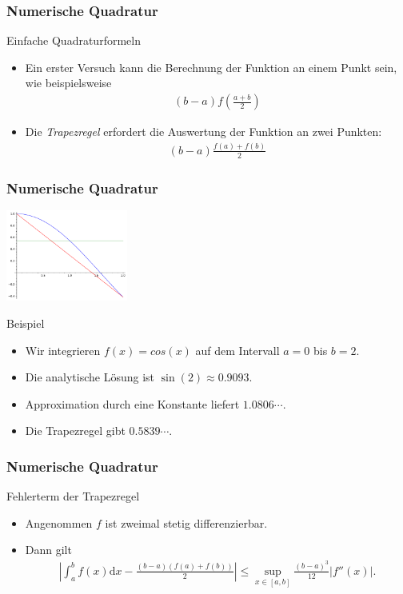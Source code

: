 \documentclass{beamer}
\renewcommand{\emph}[1]{{\textcolor{solarizedRed}{\itshape #1}}}
\newcommand\dd{\mathrm d}
\newcommand{\abs}[1]{\left|#1\right|}
\newcommand\bc[1]{\left({#1}\right)}
\newcommand\bcfr[2]{\bc{\frac{#1}{#2}}}
\renewcommand{\oe}{\"o}
\newcommand{\mytitle}{Numerische Quadratur}
\begin{document}
\begin{frame}\frametitle{\mytitle}
	\begin{block}{Einfache Quadraturformeln}
		\begin{itemize}
			\item Ein erster Versuch kann die Berechnung der Funktion an einem Punkt sein, wie beispielsweise
				\begin{align*}
					(b-a)f\bcfr{a+b}{2}
				\end{align*}
			\item Die \emph{Trapezregel} erfordert die Auswertung der Funktion an zwei Punkten:
				\begin{align*}
					\bc{b-a}\frac{f(a)+f(b)}2
				\end{align*}
		\end{itemize}
	\end{block}
\end{frame}

\begin{frame}\frametitle{\mytitle}
	\hfill\includegraphics[height=30mm]{pics/plot_trapez.pdf}
	\begin{block}{Beispiel}
		\begin{itemize}
			\item Wir integrieren $f(x)=cos(x)$ auf dem Intervall $a=0$ bis $b=2$.
			\item Die analytische L\oe sung ist $\sin(2)\approx0.9093$.
			\item Approximation durch eine Konstante liefert $1.0806\cdots$.
			\item Die Trapezregel gibt $0.5839\cdots$.
		\end{itemize}
	\end{block}
\end{frame}

\begin{frame}\frametitle{\mytitle}
	\begin{block}{Fehlerterm der Trapezregel}
		\begin{itemize}
			\item Angenommen $f$ ist zweimal stetig differenzierbar.
			\item Dann gilt
				\begin{align*}
					\abs{\int_a^bf(x)\dd x-\frac{(b-a)(f(a)+f(b))}{2}}\leq\sup_{x\in[a,b]}\frac{(b-a)^3}{12}|f''(x)|.
				\end{align*}
		\end{itemize}
	\end{block}
\end{frame}
\end{document}
